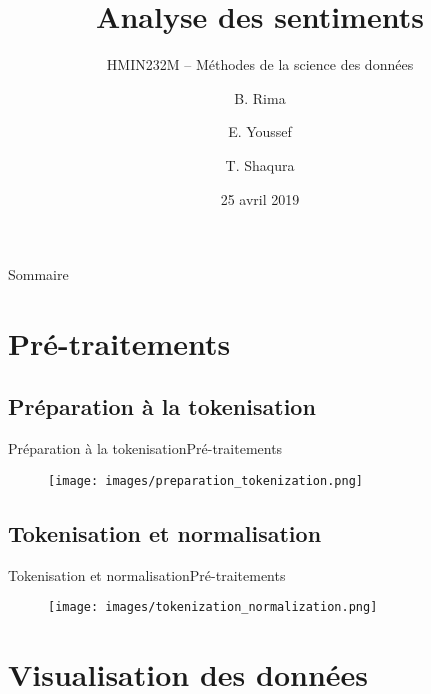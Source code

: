 \documentclass[usenames,dvipsnames]{beamer}
\title{Analyse des sentiments}
\subtitle{HMIN232M -- Méthodes de la science des données}
\author{B. Rima \and E. Youssef \and T. Shaqura}
\institute[UM]{M1 Informatique AIGLE}
\date{25 avril 2019}
\begin{document}
\begin{frame}
\titlepage
\end{frame}
\begin{frame}{Sommaire}
\tableofcontents
\end{frame}
\section{Pré-traitements}
\subsection{Préparation à la tokenisation}
\begin{frame}{Préparation à la tokenisation}{Pré-traitements}
\begin{figure}[!ht]
  \centering
  \texttt{[image: images/preparation\_tokenization.png]}
\end{figure}
\end{frame}

\subsection{Tokenisation et normalisation}
\begin{frame}{Tokenisation et normalisation}{Pré-traitements}
\begin{figure}[!ht]
  \centering
  \texttt{[image: images/tokenization\_normalization.png]}
\end{figure}
\end{frame}

\section{Visualisation des données}
\end{document}
